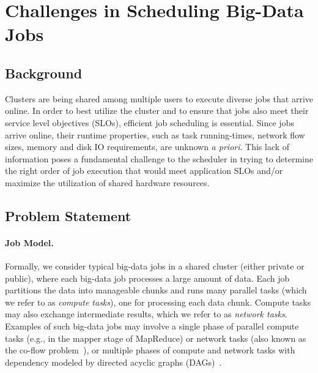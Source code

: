 \section{Challenges in Scheduling Big-Data Jobs}
\label{sec:back}
 
\subsection{Background}
\label{subsec:back}
 
Clusters are being shared among multiple users to execute diverse
jobs that arrive online. 
In order to best utilize the cluster and to ensure that
jobs also meet their service level objectives (SLOs), efficient job
scheduling is essential. Since jobs arrive online, their runtime
properties, such as task running-times, network flow sizes, 
memory and disk IO requirements,
are unknown \emph{a priori}. This lack of information 
poses a fundamental challenge to the scheduler in trying to determine
the right order of job execution that would meet application SLOs
and/or maximize the utilization of shared hardware resources.
 
\subsection{Problem Statement}
 
\paragraph*{Job Model.}
Formally, we consider typical big-data jobs in a shared cluster (either
private or public), where each big-data job processes a large amount of
data. Each job partitions the data into manageable chunks and runs many
parallel tasks (which we refer to as \emph{compute tasks}), one for processing each data chunk. 
Compute tasks may also exchange intermediate results, which we refer to as
\emph{network tasks}. 
%
Examples of such big-data jobs may involve a single phase of parallel
compute tasks (e.g., in the mapper stage of MapReduce) or network tasks
(also known as the co-flow
problem~\cite{coflow:hotnets12,aalo:sigcomm2015,
varys:sigcomm14,baraat:sigcomm14, graviton:hotcloud16,
jajooSaath,jajoo:atc2019}), or multiple phases of compute and network
tasks with dependency modeled by
directed acyclic graphs (DAGs)~\cite{mapreduceonline:nsdi2010,
apache:tez, dryad:eurosys2007, dandelion:sosp2013}.

